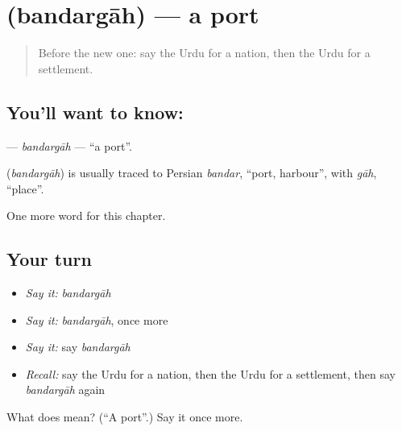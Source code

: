 \section[\texorpdfstring{\ur{بندرگاہ} (bandargāh)}{بندرگاہ (bandargāh)}]{ (bandargāh) — a port}

\label{lesson:UR-C158-bandargah}



\begin{quote}
Before the new one: say the Urdu for a nation, then the Urdu for a settlement.
\end{quote}

\subsection*{You'll want to know: }
\textbf{} — \emph{bandargāh} — \textquotedblleft{}a port\textquotedblright{}.

\begin{cousinweb}
\textbf{} (\emph{bandargāh}) is usually traced to Persian \emph{bandar}, \textquotedblleft{}port, harbour\textquotedblright{}, with \emph{gāh}, \textquotedblleft{}place\textquotedblright{}.
\end{cousinweb}

\begin{grammarlens}[title={What you've built}]
One more word for this chapter.
\end{grammarlens}

\subsection*{Your turn}
\begin{itemize}
\raggedright
  \item \emph{Say it:} \emph{bandargāh}
  \item \emph{Say it:} \emph{bandargāh}, once more
  \item \emph{Say it:} say \emph{bandargāh}
  \item \emph{Recall:} say the Urdu for a nation, then the Urdu for a settlement, then say \emph{bandargāh} again
\end{itemize}

\begin{tcolorbox}[breakable,colback=teal!4,colframe=teal!35!black,title={Before you move on}]
What does  mean? (\textquotedblleft{}A port\textquotedblright{}.) Say it once more.
\end{tcolorbox}
